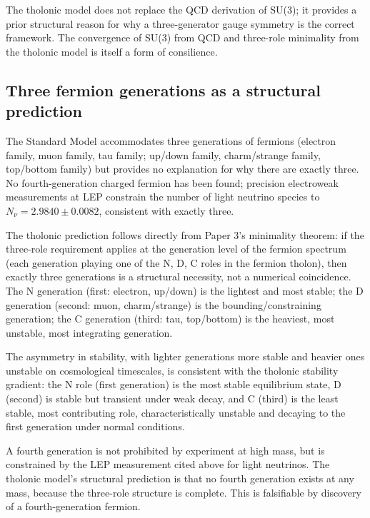 \documentclass[12pt]{article}
\begin{document}
The tholonic model does not replace the QCD derivation of SU(3); it
provides a prior structural reason for why a three-generator gauge
symmetry is the correct framework. The convergence of SU(3) from QCD and
three-role minimality from the tholonic model is itself a form of
consilience.

\subsection{Three fermion generations as a structural prediction}\label{three-fermion-generations-as-a-structural-prediction}

The Standard Model accommodates three generations of fermions (electron
family, muon family, tau family; up/down family, charm/strange family,
top/bottom family) but provides no explanation for why there are exactly
three. No fourth-generation charged fermion has been found; precision
electroweak measurements at LEP constrain the number of light neutrino
species to \(N_\nu = 2.9840 \pm 0.0082\), consistent with exactly three.

The tholonic prediction follows directly from Paper 3's minimality
theorem: if the three-role requirement applies at the generation level
of the fermion spectrum (each generation playing one of the N, D, C
roles in the fermion tholon), then exactly three generations is a
structural necessity, not a numerical coincidence. The N generation
(first: electron, up/down) is the lightest and most stable; the D
generation (second: muon, charm/strange) is the bounding/constraining
generation; the C generation (third: tau, top/bottom) is the heaviest,
most unstable, most integrating generation.

The asymmetry in stability, with lighter generations more stable and
heavier ones unstable on cosmological timescales, is consistent with the
tholonic stability gradient: the N role (first generation) is the most
stable equilibrium state, D (second) is stable but transient under weak
decay, and C (third) is the least stable, most contributing role,
characteristically unstable and decaying to the first generation under
normal conditions.

A fourth generation is not prohibited by experiment at high mass, but is
constrained by the LEP measurement cited above for light neutrinos. The
tholonic model's structural prediction is that no fourth generation
exists at any mass, because the three-role structure is complete. This
is falsifiable by discovery of a fourth-generation fermion.
\end{document}
